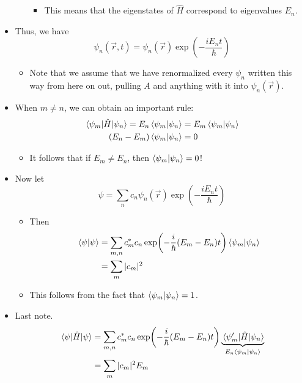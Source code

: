 \documentclass[../notes.tex]{subfiles}
\begin{document}
\begin{itemize}
\begin{itemize}
\begin{itemize}
            \item This means that the eigenstates of $\hat{H}$ correspond to eigenvalues $E_n$.
        \end{itemize}
    \end{itemize}
    \item Thus, we have
    \begin{equation*}
        \psi_n(\vec{r},t) = \psi_n(\vec{r})\exp(-\frac{iE_nt}{\hbar})
    \end{equation*}
    \begin{itemize}
        \item Note that we assume that we have renormalized every $\psi_n$ written this way from here on out, pulling $A$ and anything with it into $\psi_n(\vec{r})$.
    \end{itemize}
    \item When $m\neq n$, we can obtain an important rule:
    \begin{align*}
        \mel{\psi_m}{\hat{H}}{\psi_n} = E_n\braket{\psi_m}{\psi_n} &= E_m\braket{\psi_m}{\psi_n}\\
        (E_n-E_m)\braket{\psi_m}{\psi_n} &= 0
    \end{align*}
    \begin{itemize}
        \item It follows that if $E_m\neq E_n$, then $\braket{\psi_m}{\psi_n}=0$!
    \end{itemize}
    \item Now let
    \begin{equation*}
        \psi = \sum_nc_n\psi_n(\vec{r})\exp(-\frac{iE_nt}{\hbar})
    \end{equation*}
    \begin{itemize}
        \item Then
        \begin{align*}
            \braket{\psi} &= \sum_{m,n}c_m^*c_n\exp(-\frac{i}{\hbar}(E_m-E_n)t)\braket{\psi_m}{\psi_n}\\
            &= \sum_m|c_m|^2
        \end{align*}
        \item This follows from the fact that $\braket{\psi_m}{\psi_n}=1$.
    \end{itemize}
    \item Last note.
    \begin{align*}
        \ev{\hat{H}}{\psi} &= \sum_{m,n}c_m^*c_n\exp(-\frac{i}{\hbar}(E_m-E_n)t)\underbrace{\mel{\psi_m'}{\hat{H}}{\psi_n}}_{E_n\braket{\psi_m}{\psi_n}}\\
        &= \sum_m|c_m|^2E_m
    \end{align*}
\end{itemize}
\end{document}
